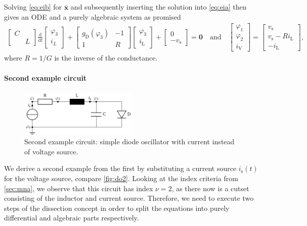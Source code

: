 \documentclass[AMA,STIX1COL]{WileyNJD-v2}
\newcommand{\mb}[1]{\mathbf{#1}}
\newcommand{\mbb}[1]{\bar{\mathbf{#1}}}
\newcommand{\mr}[1]{\mathrm{#1}}
\newcommand{\ddt}{\frac{\mathrm{d}}{\mathrm{d}t}}
\begin{document}
Solving \eqref{eq:eib} for $\mbb{x}$ and subsequently inserting the solution into \eqref{eq:eia} then gives an ODE and a purely algebraic system as promised
\begin{align}
    \begin{bmatrix}
        C &\\
        & L
    \end{bmatrix} \ddt \begin{bmatrix}
        \varphi_3\\
        i_L
    \end{bmatrix} + \begin{bmatrix}
        g_\mr{D}(\varphi_3) & -1\\
        1 & R
    \end{bmatrix} \begin{bmatrix}
        \varphi_3\\
        i_\mr{L}
    \end{bmatrix} + \begin{bmatrix}
        0\\
        -v_\mr{s}
    \end{bmatrix} = \mb{0} \quad \text{and} \quad \begin{bmatrix}
        \varphi_1\\
        \varphi_2\\
        i_\mr{V}
    \end{bmatrix} = \begin{bmatrix}
        v_\mr{s}\\
        v_\mr{s} - R i_\mr{L}\\
        -i_\mr{L}
    \end{bmatrix}, \label{eq:do1}
\end{align}
where $R = 1/G$ is the inverse of the conductance.

\paragraph{Second example circuit}
\begin{figure}
    \begin{center}
        \includegraphics[width=0.5\textwidth]{do2}
    \end{center}
    \caption{Second example circuit: simple diode oscillator with current instead of voltage source.}
    \label{fig:do2}
\end{figure}
We derive a second example from the first by substituting a current source $i_\mr{s}(t)$ for the voltage source, compare \autoref{fig:do2}. Looking at the index criteria from \autoref{sec:mna}, we observe that this circuit has index $\nu = 2$, as there now is a cutset consisting of the inductor and current source. Therefore, we need to execute two steps of the dissection concept in order to split the equations into purely differential and algebraic parts respectively.
\end{document}
